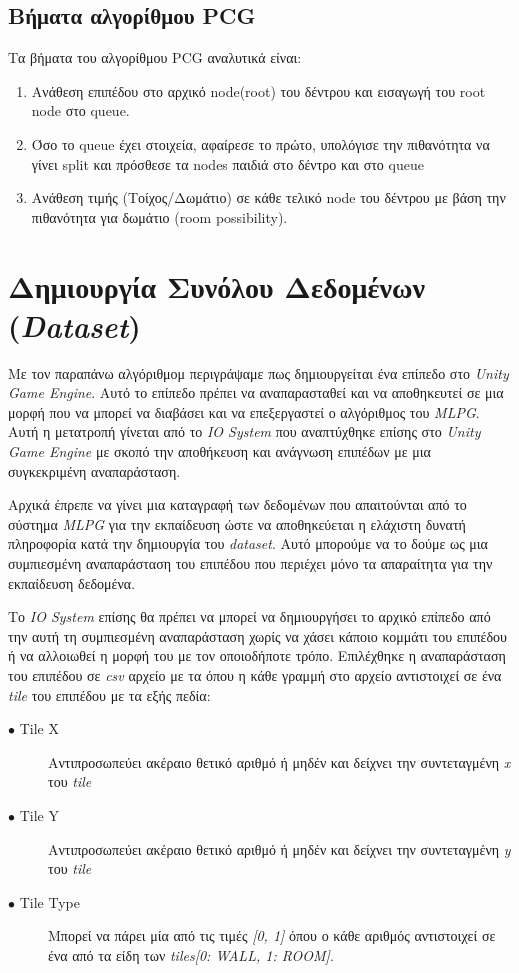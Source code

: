 \subsection{Βήματα αλγορίθμου PCG}
Τα βήματα του αλγορίθμου PCG αναλυτικά είναι:

\begin{enumerate}
	\item Ανάθεση επιπέδου στο αρχικό node(root) του δέντρου και εισαγωγή του root node στο queue.
	\item Όσο το queue έχει στοιχεία, αφαίρεσε το πρώτο, υπολόγισε την πιθανότητα να γίνει split και πρόσθεσε τα nodes παιδιά στο δέντρο και στο queue
	\item Ανάθεση τιμής (Τοίχος/Δωμάτιο) σε κάθε τελικό node του δέντρου με βάση την πιθανότητα για δωμάτιο (room possibility).
\end{enumerate}

\section{Δημιουργία Συνόλου Δεδομένων (\textit{Dataset})}
Με τον παραπάνω αλγόριθμομ περιγράψαμε πως δημιουργείται ένα επίπεδο στο \textit{Unity Game Engine}. Αυτό το επίπεδο πρέπει να αναπαρασταθεί και να αποθηκευτεί σε μια μορφή που να μπορεί να διαβάσει και να επεξεργαστεί ο αλγόριθμος του \textit{MLPG}. Αυτή η μετατροπή γίνεται από το \textit{IO System} που αναπτύχθηκε επίσης στο \textit{Unity Game Engine} με σκοπό την αποθήκευση και ανάγνωση επιπέδων με μια συγκεκριμένη αναπαράσταση.
\par
Αρχικά έπρεπε να γίνει μια καταγραφή των δεδομένων που απαιτούνται από το σύστημα \textit{MLPG} για την εκπαίδευση ώστε να αποθηκεύεται η ελάχιστη δυνατή πληροφορία κατά την δημιουργία του \textit{dataset}. Αυτό μπορούμε να το δούμε ως μια συμπιεσμένη αναπαράσταση του επιπέδου που περιέχει μόνο τα απαραίτητα για την εκπαίδευση δεδομένα.
\par
Το \textit{IO System} επίσης θα πρέπει να μπορεί να δημιουργήσει το αρχικό επίπεδο από την αυτή τη συμπιεσμένη αναπαράσταση χωρίς να χάσει κάποιο κομμάτι του επιπέδου ή να αλλοιωθεί η μορφή του με τον οποιοδήποτε τρόπο. Επιλέχθηκε η αναπαράσταση του επιπέδου σε \textit{csv} αρχείο με τα όπου η κάθε γραμμή στο αρχείο αντιστοιχεί σε ένα \textit{tile} του επιπέδου με τα εξής πεδία:

\begin{description}
\item[$\bullet$ Tile X] Αντιπροσωπεύει ακέραιο θετικό αριθμό ή μηδέν και δείχνει την συντεταγμένη \textit{x} του \textit{tile}
\item[$\bullet$ Tile Y] Αντιπροσωπεύει ακέραιο θετικό αριθμό ή μηδέν και δείχνει την συντεταγμένη \textit{y} του \textit{tile}
\item[$\bullet$ Tile Type] Μπορεί να πάρει μία από τις τιμές \textit{[0, 1]} όπου ο κάθε αριθμός αντιστοιχεί σε ένα από τα είδη των \textit{tiles}\textit{[0: WALL, 1: ROOM]}.
\end{description}

